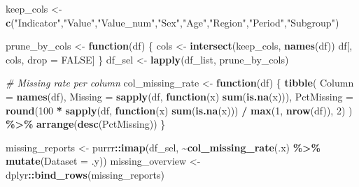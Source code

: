 \documentclass[
]{article}
\newenvironment{Shaded}{\begin{snugshade}}{\end{snugshade}}
\newcommand{\AttributeTok}[1]{\textcolor[rgb]{0.13,0.29,0.53}{#1}}
\newcommand{\CommentTok}[1]{\textcolor[rgb]{0.56,0.35,0.01}{\textit{#1}}}
\newcommand{\ConstantTok}[1]{\textcolor[rgb]{0.56,0.35,0.01}{#1}}
\newcommand{\ControlFlowTok}[1]{\textcolor[rgb]{0.13,0.29,0.53}{\textbf{#1}}}
\newcommand{\DecValTok}[1]{\textcolor[rgb]{0.00,0.00,0.81}{#1}}
\newcommand{\FunctionTok}[1]{\textcolor[rgb]{0.13,0.29,0.53}{\textbf{#1}}}
\newcommand{\NormalTok}[1]{#1}
\newcommand{\OtherTok}[1]{\textcolor[rgb]{0.56,0.35,0.01}{#1}}
\newcommand{\SpecialCharTok}[1]{\textcolor[rgb]{0.81,0.36,0.00}{\textbf{#1}}}
\newcommand{\StringTok}[1]{\textcolor[rgb]{0.31,0.60,0.02}{#1}}
\begin{document}
\begin{Shaded}
\begin{Highlighting}[]
\NormalTok{keep\_cols }\OtherTok{\textless{}{-}} \FunctionTok{c}\NormalTok{(}\StringTok{"Indicator"}\NormalTok{,}\StringTok{"Value"}\NormalTok{,}\StringTok{"Value\_num"}\NormalTok{,}\StringTok{"Sex"}\NormalTok{,}\StringTok{"Age"}\NormalTok{,}\StringTok{"Region"}\NormalTok{,}\StringTok{"Period"}\NormalTok{,}\StringTok{"Subgroup"}\NormalTok{)}

\NormalTok{prune\_by\_cols }\OtherTok{\textless{}{-}} \ControlFlowTok{function}\NormalTok{(df) \{}
\NormalTok{  cols }\OtherTok{\textless{}{-}} \FunctionTok{intersect}\NormalTok{(keep\_cols, }\FunctionTok{names}\NormalTok{(df))}
\NormalTok{  df[, cols, drop }\OtherTok{=} \ConstantTok{FALSE}\NormalTok{]}
\NormalTok{\}}
\NormalTok{df\_sel }\OtherTok{\textless{}{-}} \FunctionTok{lapply}\NormalTok{(df\_list, prune\_by\_cols)}

\CommentTok{\# Missing rate per column}
\NormalTok{col\_missing\_rate }\OtherTok{\textless{}{-}} \ControlFlowTok{function}\NormalTok{(df) \{}
  \FunctionTok{tibble}\NormalTok{(}
    \AttributeTok{Column     =} \FunctionTok{names}\NormalTok{(df),}
    \AttributeTok{Missing    =} \FunctionTok{sapply}\NormalTok{(df, }\ControlFlowTok{function}\NormalTok{(x) }\FunctionTok{sum}\NormalTok{(}\FunctionTok{is.na}\NormalTok{(x))),}
    \AttributeTok{PctMissing =} \FunctionTok{round}\NormalTok{(}\DecValTok{100} \SpecialCharTok{*} \FunctionTok{sapply}\NormalTok{(df, }\ControlFlowTok{function}\NormalTok{(x) }\FunctionTok{sum}\NormalTok{(}\FunctionTok{is.na}\NormalTok{(x))) }\SpecialCharTok{/} \FunctionTok{max}\NormalTok{(}\DecValTok{1}\NormalTok{, }\FunctionTok{nrow}\NormalTok{(df)), }\DecValTok{2}\NormalTok{)}
\NormalTok{  ) }\SpecialCharTok{\%\textgreater{}\%} \FunctionTok{arrange}\NormalTok{(}\FunctionTok{desc}\NormalTok{(PctMissing))}
\NormalTok{\}}

\NormalTok{missing\_reports }\OtherTok{\textless{}{-}}\NormalTok{ purrr}\SpecialCharTok{::}\FunctionTok{imap}\NormalTok{(df\_sel, }\SpecialCharTok{\textasciitilde{}}\FunctionTok{col\_missing\_rate}\NormalTok{(.x) }\SpecialCharTok{\%\textgreater{}\%} \FunctionTok{mutate}\NormalTok{(}\AttributeTok{Dataset =}\NormalTok{ .y))}
\NormalTok{missing\_overview }\OtherTok{\textless{}{-}}\NormalTok{ dplyr}\SpecialCharTok{::}\FunctionTok{bind\_rows}\NormalTok{(missing\_reports)}


\end{Highlighting}
\end{Shaded}
\end{document}
